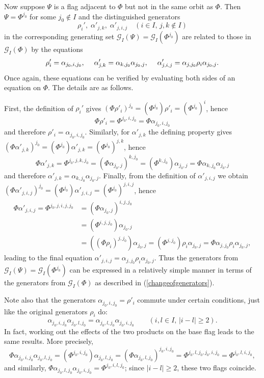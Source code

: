 \documentclass[12pt]{article}
\renewcommand{\>}{\rangle}
\renewcommand{\geq}{\geqslant}
\newcommand{\qq}{\hspace{.15cm}}
\theoremstyle{definition}\newtheorem{definition}{Definition}[section]
\begin{document}
Now suppose $\Psi$ is a flag adjacent to $\Phi$ but not in the same orbit as $\Phi$. Then $\Psi=\Phi^{j_0}$ for some $j_0 \notin I$ and the distinguished generators 
\[\rho_i',\;\alpha'_{j,k},\; \alpha'_{j,i,j}\quad (i \in I,\,j,k \notin I)\]
in the corresponding generating set $\mathcal{G}_{I}(\Psi)=\mathcal{G}_{I}(\Phi^{j_0})$ are related to those in $\mathcal{G}_{I}(\Phi)$ by the equations
\begin{eqnarray}
\label{changeofgenerators}
\rho'_i = \alpha_{j_0,i,j_0}, \qq \qq \qq \alpha'_{j,k}= \alpha_{k,j_0}\alpha_{j_0,j}, \qq \qq \qq \alpha'_{j,i,j}=\alpha_{j,j_0}\rho_i\alpha_{j_0,j}.
\end{eqnarray}
Once again, these equations can be verified by evaluating both sides of an equation on $\Phi$. The details are as follows.

First, the definition of $\rho_i'$ gives $(\Phi\rho'_i)^{j_0} =(\Phi^{j_0})\rho'_i = (\Phi^{j_0})^i$, hence 
\[ \Phi\rho'_i =\Phi^{j_0,i,j_0} = \Phi\alpha_{j_0,i,j_0}\]
and therefore $\rho'_i = \alpha_{j_0,i,j_0}$.
Similarly, for $\alpha'_{j,k}$ the defining property gives 
$(\Phi\alpha'_{j,k})^{j_0} = (\Phi^{j_0})\alpha'_{j,k} = (\Phi^{j_0})^{j,k}$,
hence 
\[ \Phi\alpha'_{j,k} =\Phi^{j_0,j,k,j_0} = (\Phi\alpha_{j_0,j})^{k,j_0} 
= (\Phi^{k,j_0})\alpha_{j_0,j} = \Phi\alpha_{k,j_0}\alpha_{j_0,j}\]
and therefore $\alpha'_{j,k} = \alpha_{k,j_0}\alpha_{j_0,j}$. Finally, from the definition of $\alpha'_{j,i,j}$ we obtain  
$(\Phi\alpha'_{j,i,j})^{j_0} =(\Phi^{j_0})\alpha'_{j,i,j} =(\Phi^{j_0})^{j,i,j}$,
hence  
\[\begin{array}{ll}
\Phi\alpha'_{j,i,j} = \Phi^{j_0,j,i,j,j_0} &= (\Phi\alpha_{j_0,j})^{i,j,j_0} \\[.03in]
&= (\Phi^{i,j,j_0})\alpha_{j_0,j} \\[.03in]
&= ((\Phi\rho_{i})^{j,j_0})\alpha_{j_0,j} = (\Phi^{j,j_0})\rho_{i}\alpha_{j_0,j}
=\Phi\alpha_{j,j_0}\rho_i\alpha_{j_0,j}, 
\end{array}\]
leading to the final equation $\alpha'_{j,i,j}=\alpha_{j,j_0}\rho_i\alpha_{j_0,j}$.
Thus the generators from $\mathcal{G}_{I}(\Psi)=\mathcal{G}_{I}(\Phi^{j_0})$ can be expressed in a relatively simple manner in terms of the generators from $\mathcal{G}_{I}(\Phi)$ as described in (\ref{changeofgenerators}). 
\smallskip

Note also that the generators $\alpha_{j_0,i,j_0}=\rho'_{i}$ commute under certain conditions, just like the original generators $\rho_i$ do:
\begin{equation}
\label{alphascom}
\alpha_{j_0,i,j_0}\alpha_{j_0,l,j_0} = \alpha_{j_0,l,j_0}\alpha_{j_0,i,j_0} \qquad (i,l\in I,\, |i-l|\geq 2).
\end{equation} 
In fact, working out the effects of the two products on the base flag leads to the same results. More precisely, 
\[\Phi\alpha_{j_0,i,j_0}\alpha_{j_0,l,j_0}=
(\Phi^{j_0,i,j_0})\alpha_{j_0,l,j_0}=(\Phi\alpha_{j_0,l,j_0})^{j_0,i,j_0}
=\Phi^{j_0,l,j_0,j_0,i,j_0}=\Phi^{j_0,l,i,j_0},\]
and similarly, $\Phi\alpha_{j_0,l,j_0}\alpha_{j_0,i,j_0}=\Phi^{j_0,i,l,j_0}$;
since $|i-l|\geq 2$, these two flags coincide.
\end{document}
